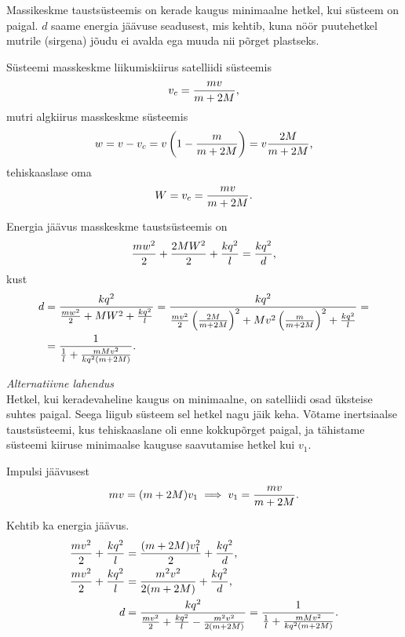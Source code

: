 \documentclass[10pt]{article}
\begin{document}
{%

\solu
Massikeskme taustsüsteemis on kerade kaugus minimaalne hetkel, kui süsteem on
paigal. $d$ saame energia jäävuse seadusest, mis kehtib, kuna nöör puutehetkel
mutrile (sirgena) jõudu ei avalda ega muuda nii põrget plastseks.

Süsteemi masskeskme liikumiskiirus satelliidi süsteemis
\[ v_c = \frac{m v}{m+2M} \text, \]
mutri algkiirus masskeskme süsteemis
\[ w = v - v_c = v \left(1 - \frac{m}{m+2M}\right) = v \frac{2M}{m+2M} \text, \]
tehiskaaslase oma
\[ W = v_c = \frac{m v}{m+2M} \text. \]

Energia jäävus masskeskme taustsüsteemis on
\[
\frac{m w^2}{2} + \frac{2M W^2}{2} + \frac{k q^2}{l} = \frac{k q^2}{d} \text,
\]
kust
\begin{align*}
d &= \frac{k q^2}{\frac{m w^2}{2} + M W^2 + \frac{k q^2}{l}} =
\frac{k q^2}{\frac{m v^2}{2} \left(\frac{2M}{m+2M}\right)^2 + M v^2
	\left(\frac{m}{m+2M}\right)^2 + \frac{k q^2}{l}} = \\
&= \frac{1}{\frac{1}{l} + \frac{m M v^2}{k q^2 (m+2M)}}
\text.
\end{align*}

\vspace{0.5\baselineskip}

\emph{Alternatiivne lahendus}\\
Hetkel, kui keradevaheline kaugus on minimaalne, on satelliidi osad üksteise
suhtes paigal. Seega liigub süsteem sel hetkel nagu jäik keha. Võtame
inertsiaalse taustsüsteemi, kus tehiskaaslane oli enne kokkupõrget paigal, ja
tähistame süsteemi kiiruse minimaalse kauguse saavutamise hetkel kui $v_1$.

Impulsi jäävusest
\[ m v = (m+2M) v_1 \implies v_1 = \frac{m v}{m+2M}\text. \]

Kehtib ka energia jäävus.
\begin{align*}
\frac{m v^2}{2} + \frac{k q^2}{l} &= \frac{(m+2M) v_1^2}{2} + \frac{k q^2}{d}
\text, \\
\frac{m v^2}{2} + \frac{k q^2}{l} &= \frac{m^2 v^2}{2 (m+2M)} + \frac{k q^2}{d}
\text, \\
d &= \frac{k q^2}{\frac{m v^2}{2} + \frac{k q^2}{l} - \frac{m^2 v^2}{2 (m+2M)}}
= \frac{1}{\frac{1}{l} + \frac{m M v^2}{k q^2 (m+2M)}} \text.
\end{align*}
\probend
\bigskip


}
\end{document}
